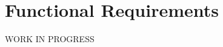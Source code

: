 \documentclass[../../rasd.tex]{subfiles}
\begin{document}
\section{Functional Requirements}
		WORK IN PROGRESS
\end{document}
